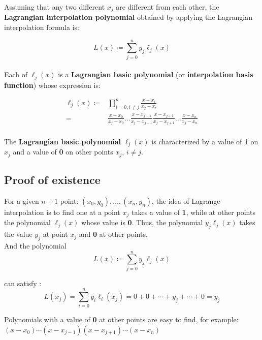 \documentclass[12pt,a4paper]{article}
\begin{document}
\begin{spacing}{1.5}
\noindent Assuming that any two different ${x_{j}}$ are different from each other, the \textbf{Lagrangian interpolation polynomial} obtained by applying the Lagrangian interpolation formula is:

\begin{equation}
	L(x) \coloneqq \sum_{j=0}^n y_j \ell_j(x)
\end{equation}\\

\noindent Each of $\ell _{j}(x)$ is a \textbf{Lagrangian basic polynomial} (or \textbf{interpolation basis function}) whose expression is:

\begin{equation}
\begin{aligned}
	\ell_j(x) \coloneqq &\prod_{i = 0,i \not= j}^n 
	\frac{x-x_i}{x_j-x_i} \\
	= &\frac{x-x_0}{x_j-x_0} \ldots
	\frac{x-x_{j-1}}{x_j-x_{j-1}}
	\frac{x-x_{j+1}}{x_j-x_{j+1}} \ldots
	\frac{x-x_n}{x_j-x_n}
\end{aligned}
\end{equation}\\

\noindent The \textbf{Lagrangian basic polynomial} $\ell _{j}(x)$ is characterized by a value of \textbf{1} on ${x_{j}}$ and a value of 
\textbf{0} on other points ${x_{j}}$, ${i\neq j}$.


\newpage
\subsection{Proof of existence}
For a given $n+1$ point: $(x_{0}, y_{0}), \ldots, (x_{n}, y_{n})$, the idea of ​​Lagrange interpolation is to find one at a point $x_{j}$ takes a value of \textbf{1}, while at other points the polynomial $\ell _{j}(x)$ whose value is \textbf{0}. Thus, the polynomial $y_{j}\ell _{j}(x)$ takes the value $y_{j}$ at point $x_{j}$ and \textbf{0} at other points. \\

\noindent And the polynomial 
\begin{equation*}
	L(x) \coloneqq \sum_{j=0}^n y_j \ell_j(x)
\end{equation*}

\noindent can satisfy :
\begin{equation*}
	L(x_{j})=\sum _{{i=0}}^{{n}}y_{i}\ell _{i}(x_{j})
	=0+0+\cdots +y_{j}+\cdots +0
	=y_{j}
\end{equation*}

\noindent Polynomials with a value of \textbf{0} at other points are easy to find, for example:\\
$(x-x_{0})\cdots (x-x_{{j-1}})(x-x_{{j+1}})\cdots (x-x_{{n}})$\\


\end{spacing}
\end{document}
